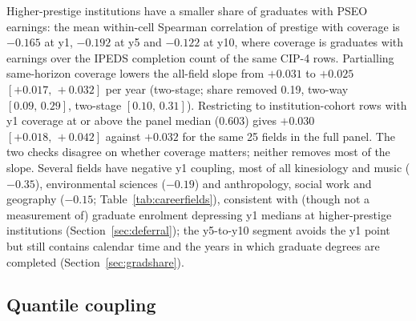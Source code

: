 \documentclass[11pt]{article}
\newcommand{\ci}[2]{$[#1,\allowbreak\,#2]$}
\begin{document}
Higher-prestige institutions have a smaller share of graduates with PSEO earnings: the mean within-cell Spearman
correlation of prestige with coverage is $-0.165$ at y1, $-0.192$ at y5 and $-0.122$ at y10, where coverage is graduates with
earnings over the IPEDS completion count of the same CIP-4 rows. Partialling same-horizon coverage lowers the
all-field slope from $+0.031$ to $+0.025$ \ci{+0.017}{+0.032} per year (two-stage; share removed 0.19, two-way
\ci{0.09}{0.29}, two-stage \ci{0.10}{0.31}). Restricting to
institution-cohort rows with y1 coverage at or above the panel median (0.603) gives $+0.030$ \ci{+0.018}{+0.042} against
$+0.032$ for the same 25 fields in the full panel. The two checks disagree on whether coverage matters; neither removes
most of the slope. Several fields have negative y1 coupling, most of all kinesiology and music ($-0.35$),
environmental sciences ($-0.19$) and anthropology, social work and geography ($-0.15$; Table~\ref{tab:careerfields}),
consistent with (though not a measurement of) graduate enrolment depressing y1 medians at higher-prestige
institutions (Section~\ref{sec:deferral}); the y5-to-y10 segment avoids the y1 point but still contains calendar
time and the years in which graduate degrees are completed (Section~\ref{sec:gradshare}).

\subsection{Quantile coupling}\label{sec:quantiles}
\end{document}
